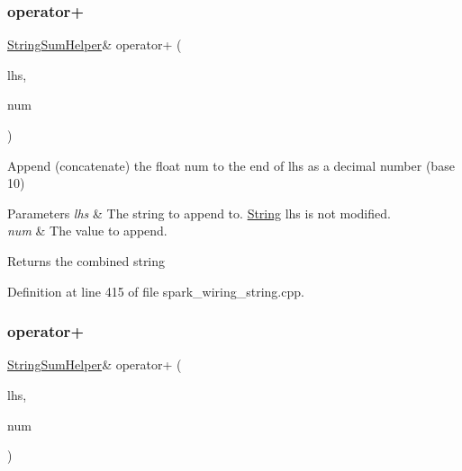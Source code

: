 \mbox{\label{class_string_a9a2cbb5207527b7dabf2ea13c48f9833}} 
\subsubsection{\texorpdfstring{operator+}{operator+}\hspace{0.1cm}{\footnotesize\ttfamily [9/10]}}
{\footnotesize\ttfamily \hyperlink{class_string_sum_helper}{String\+Sum\+Helper}\& operator+ (\begin{DoxyParamCaption}\item[{const \hyperlink{class_string_sum_helper}{String\+Sum\+Helper} \&}]{lhs,  }\item[{float}]{num }\end{DoxyParamCaption})\hspace{0.3cm}{\ttfamily [friend]}}



Append (concatenate) the float num to the end of lhs as a decimal number (base 10) 


\begin{DoxyParams}{Parameters}
{\em lhs} & The string to append to. \hyperlink{class_string}{String} lhs is not modified.\\
\hline
{\em num} & The value to append.\\
\hline
\end{DoxyParams}
\begin{DoxyReturn}{Returns}
the combined string 
\end{DoxyReturn}


Definition at line 415 of file spark\+\_\+wiring\+\_\+string.\+cpp.

\mbox{\label{class_string_ad7f8cc6402796f520aa6ddc33953f7fc}} 
\subsubsection{\texorpdfstring{operator+}{operator+}\hspace{0.1cm}{\footnotesize\ttfamily [10/10]}}
{\footnotesize\ttfamily \hyperlink{class_string_sum_helper}{String\+Sum\+Helper}\& operator+ (\begin{DoxyParamCaption}\item[{const \hyperlink{class_string_sum_helper}{String\+Sum\+Helper} \&}]{lhs,  }\item[{double}]{num }\end{DoxyParamCaption})\hspace{0.3cm}{\ttfamily [friend]}}



